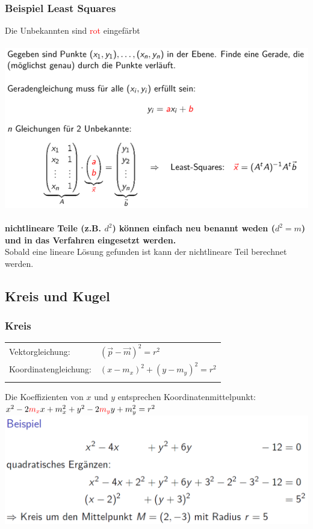 			\subsubsection{Beispiel Least Squares}
			Die Unbekannten sind \textcolor{red}{rot} eingefärbt \\
			\\
			\includegraphics[width=0.8\linewidth]{Bilder/least-squares}\\
			\\
			\textbf{nichtlineare Teile (z.B. $d^2$) können einfach neu benannt weden ($d^2 = m$) und in das Verfahren eingesetzt werden.} \\
			Sobald eine lineare Lösung gefunden ist kann der nichtlineare Teil berechnet werden.
			
			
			\subsection{Kreis und Kugel}		
			
			\subsubsection{Kreis}
			\begin{tabular}{ll}
			Vektorgleichung: & $(\vec{p} - \vec{m})^2 = r^2$\\
			Koordinatengleichung: & $(x- m_x)^2 + (y-m_y)^2 = r^2$\\
			\\
			\end{tabular}
			
			Die Koeffizienten von $x$ und $y$ entsprechen Koordinatenmittelpunkt: \\
			$x^2 - 2 \textcolor{red}{m_x} x + m_x^2 + y^2 - 2 \textcolor{red}{m_y} y + m_y^2 = r^2 $		\\
			\includegraphics[width=0.8\linewidth]{Bilder/kreisgleichung}
			
